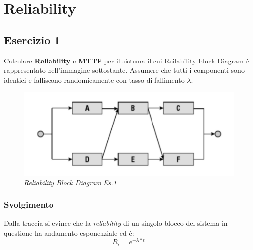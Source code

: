 \chapter{Reliability}
\section{Esercizio 1}
Calcolare \textbf{Reliability} e \textbf{MTTF} per il sistema il cui Reilability Block Diagram è rappresentato nell'immagine sottostante. Assumere che tutti i componenti sono identici e falliscono randomicamente con tasso di fallimento \textit{$\lambda$}.
\begin{figure}[H]
	\centering
	\includegraphics[width=1\textwidth]{img/hw5/es1.png}
	\caption{\textit{Reliability Block Diagram Es.1}}
\end{figure}
\subsection{Svolgimento}
Dalla traccia si evince che la \textit{reliability} di un singolo blocco del sistema in questione ha andamento esponenziale ed è:
\begin{equation*}
	R_i = e^{-\lambda*t}
\end{equation*}

